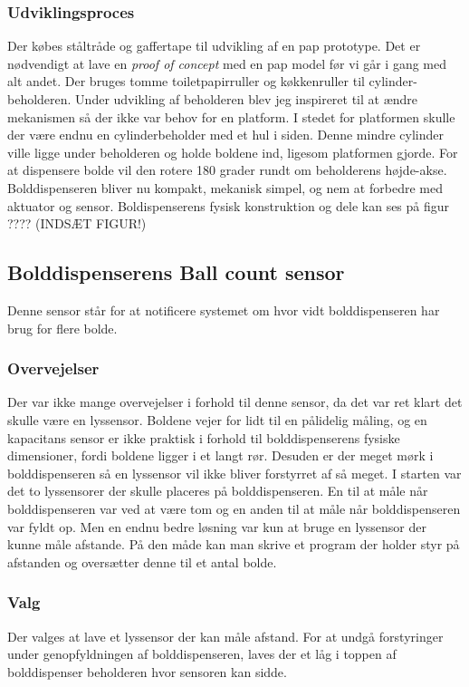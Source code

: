 \documentclass[HardwareDesign/HardwareDesign_main.tex]{subfiles}
\begin{document}
\subsubsection{Udviklingsproces}
Der købes ståltråde og gaffertape til udvikling af en pap prototype. Det er nødvendigt at lave en \textit{proof of concept} med en pap model før vi går i gang med alt andet. Der bruges tomme toiletpapirruller og køkkenruller til cylinder-beholderen. Under udvikling af beholderen blev jeg inspireret til at ændre mekanismen så der ikke var behov for en platform. I stedet for platformen skulle der være endnu en cylinderbeholder med et hul i siden. Denne mindre cylinder ville ligge under beholderen og holde boldene ind, ligesom platformen gjorde. For at dispensere bolde vil den rotere 180 grader rundt om beholderens højde-akse. Bolddispenseren bliver nu kompakt, mekanisk simpel, og nem at forbedre med aktuator og sensor. Boldispenserens fysisk konstruktion og dele kan ses på figur ????
(INDSÆT FIGUR!)
\subsection{Bolddispenserens Ball count sensor}
Denne sensor står for at notificere systemet om hvor vidt bolddispenseren har brug for flere bolde.
\subsubsection{Overvejelser}
Der var ikke mange overvejelser i forhold til denne sensor, da det var ret klart det skulle være en lyssensor. Boldene vejer for lidt til en pålidelig måling, og en kapacitans sensor er ikke praktisk i forhold til bolddispenserens fysiske dimensioner, fordi boldene ligger i et langt rør. Desuden er der meget mørk i bolddispenseren så en lyssensor vil ikke bliver forstyrret af så meget. I starten var det to lyssensorer der skulle placeres på bolddispenseren. En til at måle når bolddispenseren var ved at være tom og en anden til at måle når bolddispenseren var fyldt op. Men en endnu bedre løsning var kun at bruge en lyssensor der kunne måle afstande. På den måde kan man skrive et program der holder styr på afstanden og oversætter denne til et antal bolde.
\subsubsection{Valg}
Der valges at lave et lyssensor der kan måle afstand. For at undgå forstyringer under genopfyldningen af bolddispenseren, laves der et låg i toppen af bolddispenser beholderen hvor sensoren kan sidde.
\end{document}
